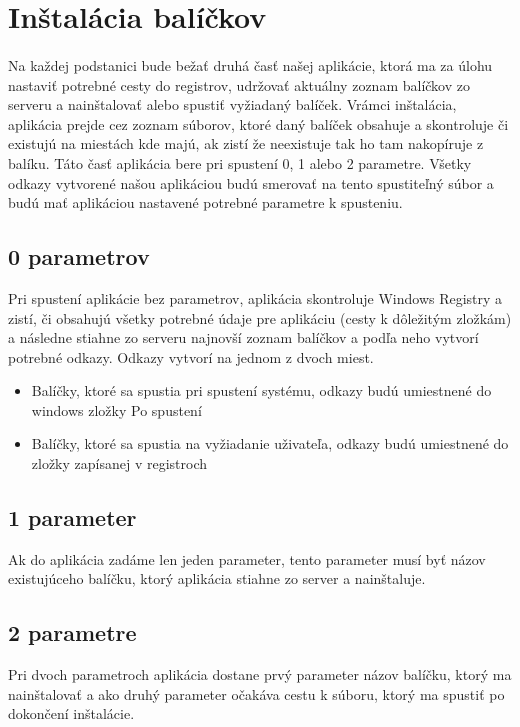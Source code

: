\section{Inštalácia balíčkov}
\paragraph{}

Na každej podstanici bude bežať druhá časť našej aplikácie, ktorá ma za úlohu nastaviť potrebné cesty do registrov, udržovať aktuálny zoznam balíčkov zo serveru a nainštalovať alebo spustiť vyžiadaný balíček. Vrámci inštalácia, aplikácia prejde cez zoznam súborov, ktoré daný balíček obsahuje a skontroluje či existujú na miestách kde majú, ak zistí že neexistuje tak ho tam nakopíruje z balíku. Táto časť aplikácia bere pri spustení 0, 1 alebo 2 parametre. Všetky odkazy vytvorené našou aplikáciou budú smerovať na tento spustiteľný súbor a budú mať aplikáciou nastavené potrebné parametre k spusteniu.

\subsection{0 parametrov}
Pri spustení aplikácie bez parametrov, aplikácia skontroluje Windows Registry a zistí, či obsahujú všetky potrebné údaje pre aplikáciu (cesty k dôležitým zložkám) a následne stiahne zo serveru najnovší zoznam balíčkov a podľa neho vytvorí potrebné odkazy. Odkazy vytvorí na jednom z dvoch miest.
\begin{itemize}
\item Balíčky, ktoré sa spustia pri spustení systému, odkazy budú umiestnené do windows zložky Po spustení
\item Balíčky, ktoré sa spustia na vyžiadanie uživateľa, odkazy budú umiestnené do zložky zapísanej v registroch
\end{itemize}

\subsection{1 parameter}
Ak do aplikácia zadáme len jeden parameter, tento parameter musí byť názov existujúceho balíčku, ktorý aplikácia stiahne zo server a nainštaluje.

\subsection{2 parametre}
Pri dvoch parametroch aplikácia dostane prvý parameter názov balíčku, ktorý ma nainštalovať a ako druhý parameter očakáva cestu k súboru, ktorý ma spustiť po dokončení inštalácie.